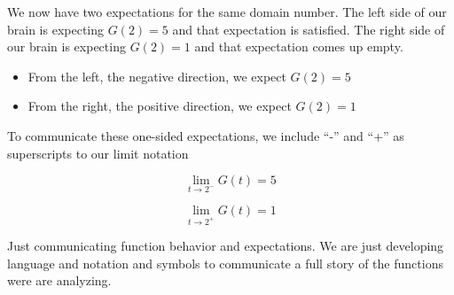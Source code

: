 \documentclass{ximera}
\begin{document}
\begin{image}
\end{image}



We now have two expectations for the same domain number. The left side of our brain is expecting $G(2)=5$ and that expectation is satisfied.  The right side of our brain is expecting $G(2)=1$ and that expectation comes up empty. 




\begin{itemize}
\item From the left, the negative direction, we expect $G(2)=5$
\item From the right, the positive direction, we expect $G(2)=1$
\end{itemize}


To communicate these one-sided expectations, we include ``-'' and ``+'' as superscripts to our limit notation 




\[   \lim\limits_{t \to 2^-} G(t) = 5 \]



\[   \lim\limits_{t \to 2^+} G(t) = 1 \]



Just communicating function behavior and expectations.  We are just developing language and notation and symbols to communicate a full story of the functions were are analyzing. 
\end{document}
